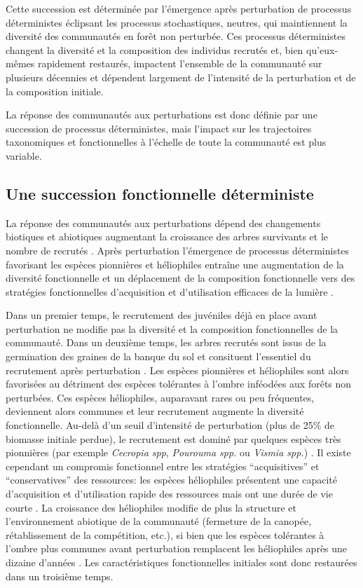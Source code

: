 \documentclass[
  11pt,
  french,
  A4paper,
  extrafontsizes,onecolumn,openright
  ]{memoir}
\begin{document}
Cette succession est déterminée par l'émergence après perturbation de
processus déterministes éclipsant les processus stochastiques, neutres,
qui maintiennent la diversité des communautés en forêt non perturbée.
Ces processus déterministes changent la diversité et la composition des
individus recrutés et, bien qu'eux-mêmes rapidement restaurés, impactent
l'ensemble de la communauté sur plusieurs décennies et dépendent
largement de l'intensité de la perturbation et de la composition
initiale.

La réponse des communautés aux perturbations est donc définie par une
succession de processus déterministes, mais l'impact sur les
trajectoires taxonomiques et fonctionnelles à l'échelle de toute la
communauté est plus variable.

\subsection{Une succession fonctionnelle
déterministe}\label{une-succession-fonctionnelle-deterministe}

La réponse des communautés aux perturbations dépend des changements
biotiques et abiotiques augmentant la croissance des arbres survivants
et le nombre de recrutés \autocite{Piponiot2016}. Après perturbation
l'émergence de processus déterministes favorisant les espèces pionnières
et héliophiles entraîne une augmentation de la diversité fonctionnelle
et un déplacement de la composition fonctionnelle vers des stratégies
fonctionnelles d'acquisition et d'utilisation efficaces de la lumière
\autocites{Violle2007b}{Baraloto2012}.

Dans un premier temps, le recrutement des juvéniles déjà en place avant
perturbation ne modifie pas la diversité et la composition
fonctionnelles de la communauté. Dans un deuxième temps, les arbres
recrutés sont issus de la germination des graines de la banque du sol et
consituent l'essentiel du recrutement après perturbation
\autocite{Lawton1988}. Les espèces pionnières et héliophiles sont alors
favorisées au détriment des espèces tolérantes à l'ombre inféodées aux
forêts non perturbées. Ces espèces héliophiles, auparavant rares ou peu
fréquentes, deviennent alors communes et leur recrutement augmente la
diversité fonctionnelle. Au-delà d'un seuil d'intensité de perturbation
(plus de 25\% de biomasse initiale perdue), le recrutement est dominé
par quelques espèces très pionnières (par exemple \emph{Cecropia spp},
\emph{Pourouma spp.} ou \emph{Vismia spp.}) \autocite{Guitet2018}. Il
existe cependant un compromis fonctionnel entre les stratégies
``acquisitives'' et ``conservatives'' des ressources: les espèces
héliophiles présentent une capacité d'acquisition et d'utilisation
rapide des ressources mais ont une durée de vie courte
\autocite{Falster2011}. La croissance des héliophiles modifie de plus la
structure et l'environnement abiotique de la communauté (fermeture de la
canopée, rétablissement de la compétition, etc.), si bien que les
espèces tolérantes à l'ombre plus communes avant perturbation remplacent
les héliophiles après une dizaine d'années \autocite{Denslow2000}. Les
caractéristiques fonctionnelles initiales sont donc restaurées dans un
troisième temps.
\end{document}
